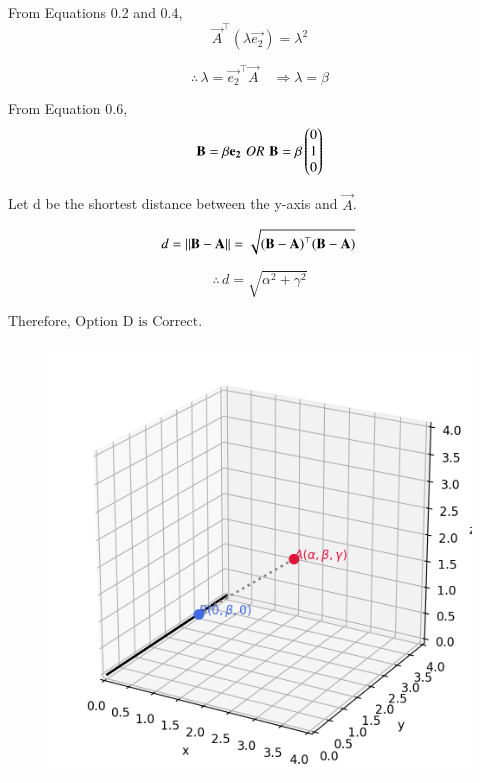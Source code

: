 \documentclass[journal]{IEEEtran}
\begin{document}
From Equations 0.2 and 0.4,
\begin{equation}
    \vec{A}^\top (\lambda\vec{e_2})=\lambda^2
\end{equation}

\begin{equation}
    \therefore \, \lambda = \vec{e_2}^\top\vec{A} \quad \Rightarrow
    \lambda = \beta 
\end{equation}

From Equation 0.6,
\begin{equation}
    \mathbf{B} = \beta\mathbf{e_2} \, \, OR \, \, \mathbf{B} = \beta\begin{pmatrix}0 \\ 1 \\ 0\end{pmatrix}
\end{equation}

Let d be the shortest distance between the y-axis and $\vec{A}$.

\begin{equation}
    d = \left\lVert\mathbf{B}-\mathbf{A}\right\rVert = \sqrt{\mathbf{(B-A)}^\top\mathbf{(B-A)}} \,  
\end{equation}

\begin{equation}
\therefore \, d = \sqrt{\alpha^2 + \gamma^2}    
\end{equation}

\begin{center}
$\boxed{\text{Therefore, Option D is Correct.}}$
\end{center}

\begin{figure}[htbp]
    \centering
    \includegraphics[width=\columnwidth]{figs/fig1.png}
    \label{fig:fig/fig1.png}
\end{figure}
\end{document}
